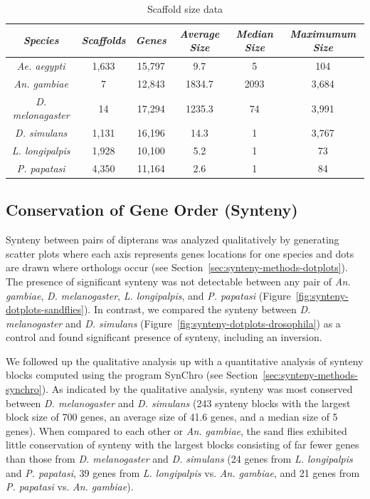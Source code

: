 \begin{table}[H]
  \centering
  \begin{tabular}{c c c c c c} \hline
    \emph{Species} & \emph{Scaffolds} & \emph{Genes} & \emph{Average Size} & \emph{Median Size} & \emph{Maximumum Size} \\ \hline
    \emph{Ae. aegypti} & 1,633 & 15,797 & 9.7 & 5 & 104 \\
    \emph{An. gambiae} & 7 & 12,843 & 1834.7 & 2093 & 3,684 \\
    \emph{D. melonagaster} & 14 & 17,294 & 1235.3 & 74 & 3,991 \\ 
    \emph{D. simulans} & 1,131 & 16,196 & 14.3 & 1 & 3,767 \\ 
    \emph{L. longipalpis} & 1,928 & 10,100 & 5.2 & 1 & 73\\
    \emph{P. papatasi} & 4,350 & 11,164 & 2.6 & 1 & 84
  \end{tabular}
  \caption{Scaffold size data}
  \label{tab:scaffold-sizes}
\end{table}

\subsection{Conservation of Gene Order (Synteny)}
Synteny between pairs of dipterans was analyzed qualitatively by generating scatter plots where each axis represents genes locations for one species and dots are drawn where orthologs occur (see Section~\ref{sec:synteny-methods-dotplots}). The presence of significant synteny was not detectable between any pair of \emph{An. gambiae}, \emph{D. melanogaster}, \emph{L. longipalpis}, and \emph{P. papatasi} (Figure~\ref{fig:synteny-dotplots-sandflies}).  In contrast, we compared the synteny between \emph{D. melanogaster} and \emph{D. simulans} (Figure~\ref{fig:synteny-dotplots-drosophila}) as a control and found significant presence of synteny, including an inversion.

We followed up the qualitative analysis up with a quantitative analysis of synteny blocks computed using the program SynChro (see Section~\ref{sec:synteny-methods-synchro}). As indicated by the qualitative analysis, synteny was most conserved between \emph{D. melanogaster} and \emph{D. simulans} (243 synteny blocks with the largest block size of 700 genes, an average size of 41.6 genes, and a median size of 5 genes).  When compared to each other or \emph{An. gambiae}, the sand flies exhibited little conservation of synteny with the largest blocks consisting of far fewer genes than those from \emph{D. melanogaster} and \emph{D. simulans} (24 genes from \emph{L. longipalpis} and \emph{P. papatasi}, 39 genes from \emph{L. longipalpis} vs. \emph{An. gambiae}, and 21 genes from \emph{P. papatasi} vs. \emph{An. gambiae}).

